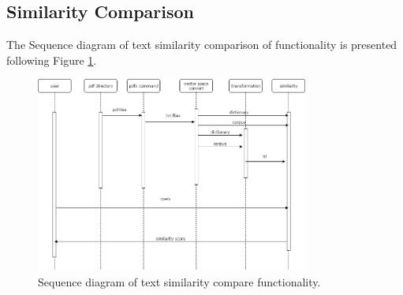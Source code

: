 \subsection{Similarity Comparison}

The Sequence diagram of text  similarity  comparison of functionality is presented  following Figure \ref{Sequence diagram}.

	\begin{figure}[htb]
		\begin{center}
			\includegraphics[width=0.8\textwidth]{Rainy_Sequence_diagram}
		\end{center}
		\caption{Sequence diagram of text similarity compare functionality.\label{Sequence diagram}}
	\end{figure}
\newpage